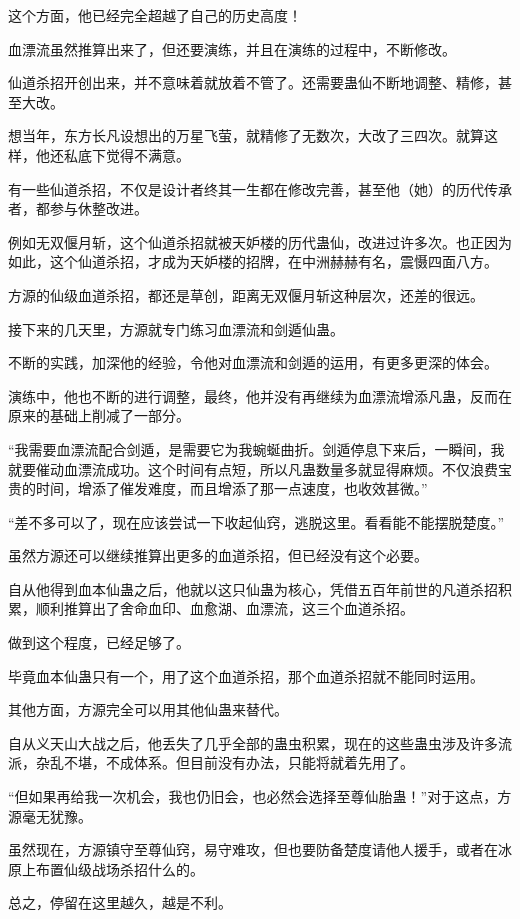\begin{this_body}
这个方面，他已经完全超越了自己的历史高度！

血漂流虽然推算出来了，但还要演练，并且在演练的过程中，不断修改。

仙道杀招开创出来，并不意味着就放着不管了。还需要蛊仙不断地调整、精修，甚至大改。

想当年，东方长凡设想出的万星飞萤，就精修了无数次，大改了三四次。就算这样，他还私底下觉得不满意。

有一些仙道杀招，不仅是设计者终其一生都在修改完善，甚至他（她）的历代传承者，都参与休整改进。

例如无双偃月斩，这个仙道杀招就被天妒楼的历代蛊仙，改进过许多次。也正因为如此，这个仙道杀招，才成为天妒楼的招牌，在中洲赫赫有名，震慑四面八方。

方源的仙级血道杀招，都还是草创，距离无双偃月斩这种层次，还差的很远。

接下来的几天里，方源就专门练习血漂流和剑遁仙蛊。

不断的实践，加深他的经验，令他对血漂流和剑遁的运用，有更多更深的体会。

演练中，他也不断的进行调整，最终，他并没有再继续为血漂流增添凡蛊，反而在原来的基础上削减了一部分。

“我需要血漂流配合剑遁，是需要它为我蜿蜒曲折。剑遁停息下来后，一瞬间，我就要催动血漂流成功。这个时间有点短，所以凡蛊数量多就显得麻烦。不仅浪费宝贵的时间，增添了催发难度，而且增添了那一点速度，也收效甚微。”

“差不多可以了，现在应该尝试一下收起仙窍，逃脱这里。看看能不能摆脱楚度。”

虽然方源还可以继续推算出更多的血道杀招，但已经没有这个必要。

自从他得到血本仙蛊之后，他就以这只仙蛊为核心，凭借五百年前世的凡道杀招积累，顺利推算出了舍命血印、血愈湖、血漂流，这三个血道杀招。

做到这个程度，已经足够了。

毕竟血本仙蛊只有一个，用了这个血道杀招，那个血道杀招就不能同时运用。

其他方面，方源完全可以用其他仙蛊来替代。

自从义天山大战之后，他丢失了几乎全部的蛊虫积累，现在的这些蛊虫涉及许多流派，杂乱不堪，不成体系。但目前没有办法，只能将就着先用了。

“但如果再给我一次机会，我也仍旧会，也必然会选择至尊仙胎蛊！”对于这点，方源毫无犹豫。

虽然现在，方源镇守至尊仙窍，易守难攻，但也要防备楚度请他人援手，或者在冰原上布置仙级战场杀招什么的。

总之，停留在这里越久，越是不利。


\end{this_body}
